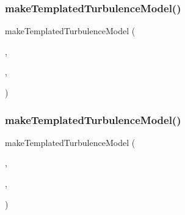 \subsubsection{\texorpdfstring{make\+Templated\+Turbulence\+Model()}{makeTemplatedTurbulenceModel()}\hspace{0.1cm}{\footnotesize\ttfamily [4/5]}}
{\footnotesize\ttfamily make\+Templated\+Turbulence\+Model (\begin{DoxyParamCaption}\item[{rho\+Thermo\+Phase\+Compressible\+Turbulence\+Model}]{,  }\item[{R\+AS}]{,  }\item[{Lahey\+K\+Epsilon}]{ }\end{DoxyParamCaption})}

\mbox{\label{multiphaseCompressibleTurbulenceModels_8C_a18939dd2bd1b1958d1c1412c286688a5}} 
\subsubsection{\texorpdfstring{make\+Templated\+Turbulence\+Model()}{makeTemplatedTurbulenceModel()}\hspace{0.1cm}{\footnotesize\ttfamily [5/5]}}
{\footnotesize\ttfamily make\+Templated\+Turbulence\+Model (\begin{DoxyParamCaption}\item[{rho\+Thermo\+Phase\+Compressible\+Turbulence\+Model}]{,  }\item[{R\+AS}]{,  }\item[{mixture\+K\+Epsilon}]{ }\end{DoxyParamCaption})}

